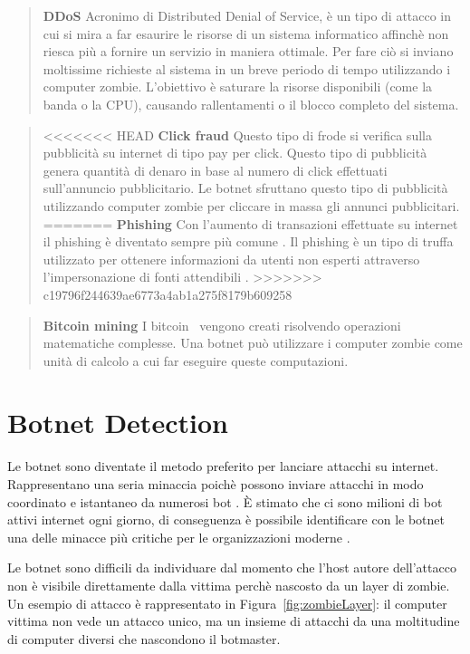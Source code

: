 \documentclass[../main.tex]{subfiles}
\begin{document}
\begin{verse}
				\textbf{DDoS} Acronimo di Distributed Denial of Service, è un tipo di attacco in cui si mira a far esaurire le risorse di un sistema informatico affinchè non riesca più a fornire un servizio in maniera ottimale. Per fare ciò si inviano moltissime richieste al sistema in un breve periodo di tempo utilizzando i computer zombie. L'obiettivo è saturare la risorse disponibili (come la banda o la CPU), causando rallentamenti o il blocco completo del sistema.
\end{verse}

\begin{verse}
<<<<<<< HEAD
				\textbf{Click fraud} Questo tipo di frode si verifica sulla pubblicità su internet di tipo pay per click. Questo tipo di pubblicità genera quantità di denaro in base al numero di click effettuati sull'annuncio pubblicitario. Le botnet sfruttano questo tipo di pubblicità utilizzando computer zombie per cliccare in massa gli annunci pubblicitari.
=======
				\textbf{Phishing} Con l'aumento di transazioni effettuate su internet il phishing è diventato sempre più comune \cite{phishing}. Il phishing è un tipo di truffa utilizzato per ottenere informazioni da utenti non esperti attraverso l'impersonazione di fonti attendibili \cite{phishingdef}.
>>>>>>> c19796f244639ae6773a4ab1a275f8179b609258
\end{verse}

\begin{verse}
				\textbf{Bitcoin mining} I bitcoin~\cite{bitcoindef} vengono creati risolvendo operazioni matematiche complesse. Una botnet può utilizzare i computer zombie come unità di calcolo a cui far eseguire queste computazioni.
\end{verse}

\section{Botnet Detection}
Le botnet sono diventate il metodo preferito per lanciare attacchi su internet. Rappresentano una seria minaccia poichè possono inviare attacchi in modo coordinato e istantaneo da numerosi bot \cite{botnetdetection}. È stimato che ci sono milioni di bot attivi internet ogni giorno, di conseguenza è possibile identificare con le botnet una delle minacce più critiche per le organizzazioni moderne \cite{botnetdetection}.

Le botnet sono difficili da individuare dal momento che l'host autore dell'attacco non è visibile direttamente dalla vittima perchè nascosto da un layer di zombie. Un esempio di attacco è rappresentato in Figura~\ref{fig:zombieLayer}: il computer vittima non vede un attacco unico, ma un insieme di attacchi da una moltitudine di computer diversi che nascondono il botmaster.
\end{document}
